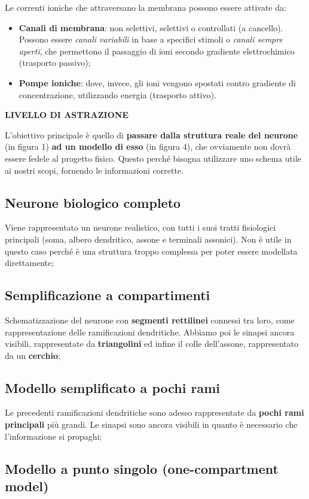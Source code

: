 Le correnti ioniche che attraversano la membrana possono essere attivate da:

\begin{itemize}
  \item \textbf{Canali di membrana}: non selettivi, selettivi o controllati (a cancello). Possono essere \textit{canali variabili }in base a specifici stimoli o \textit{canali sempre aperti}, che permettono il passaggio di ioni secondo gradiente elettrochimico (trasporto passivo);
  \item \textbf{Pompe ioniche}: dove, invece, gli ioni vengono spostati contro gradiente di concentrazione, utilizzando energia (trasporto attivo).
\end{itemize}
\textbf{LIVELLO DI ASTRAZIONE}

L'obiettivo principale è quello di \textbf{passare dalla struttura reale del neurone }(in figura 1) \textbf{ad un modello di esso }(in figura 4), che ovviamente non dovrà essere fedele al progetto fisico. Questo perché bisogna utilizzare uno schema utile ai nostri scopi, fornendo le informazioni corrette.
\subsection{Neurone biologico completo}
Viene rappresentato un neurone realistico, con tutti i suoi tratti fisiologici principali (soma, albero dendritico, assone e terminali assonici). Non è utile in questo caso perché è una struttura troppo complessa per poter essere modellata direttamente;
\subsection{Semplificazione a compartimenti}
Schematizzazione del neurone con \textbf{segmenti rettilinei }connessi tra loro, come rappresentazione delle ramificazioni dendritiche. Abbiamo poi le sinapsi ancora visibili, rappresentate da \textbf{triangolini }ed infine il colle dell'assone, rappresentato da un \textbf{cerchio};


\subsection{Modello semplificato a pochi rami}

Le precedenti ramificazioni dendritiche sono adesso rappresentate da \textbf{pochi rami principali }più grandi. Le sinapsi sono ancora visibili in quanto è necessario che l'informazione si propaghi;


\subsection{Modello a punto singolo (one-compartment model)}

